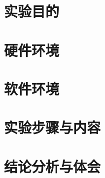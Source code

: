 \documentclass{../../../../Cls/SDU/ExpReport/ComputerNetwork/ComputerNetwork}
\begin{document}
\begin{sduDocument}
\section{实验目的}
\section{硬件环境}
\section{软件环境}
\section{实验步骤与内容}
\section{结论分析与体会}
\end{sduDocument}
\end{document}
